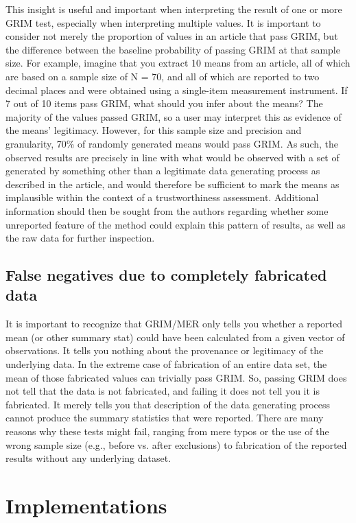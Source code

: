 \documentclass[letterpaper, 12pt]{article}
\begin{document}
{This insight is useful and important when interpreting the result of one or more GRIM test, especially when interpreting multiple values. It is important to consider not merely the proportion of values in an article that pass GRIM, but the difference between the baseline probability of passing GRIM at that sample size. For example, imagine that you extract 10 means from an article, all of which are based on a sample size of N = 70, and all of which are reported to two decimal places and were obtained using a single-item measurement instrument. If 7 out of 10 items pass GRIM, what should you infer about the means? The majority of the values passed GRIM, so a user may interpret this as evidence of the means' legitimacy. However, for this sample size and precision and granularity, 70\% of randomly generated means would pass GRIM. As such, the observed results are precisely in line with what would be observed with a set of generated by something other than a legitimate data generating process as described in the article, and would therefore be sufficient to mark the means as implausible within the context of a trustworthiness assessment. Additional information should then be sought from the authors regarding whether some unreported feature of the method could explain this pattern of results, as well as the raw data for further inspection. 

\subsection*{False negatives due to completely fabricated data}

It is important to recognize that GRIM/MER only tells you whether a reported mean (or other summary stat) could have been calculated from a given vector of observations. It tells you nothing about the provenance or legitimacy of the underlying data. In the extreme case of fabrication of an entire data set, the mean of those fabricated values can trivially pass GRIM. So, passing GRIM does not tell that the data is not fabricated, and failing it does not tell you it is fabricated. It merely tells you that description of the data generating process cannot produce the summary statistics that were reported. There are many reasons why these tests might fail, ranging from mere typos or the use of the wrong sample size (e.g., before vs. after exclusions) to fabrication of the reported results without any underlying dataset. 

\section*{Implementations}

}
\end{document}
